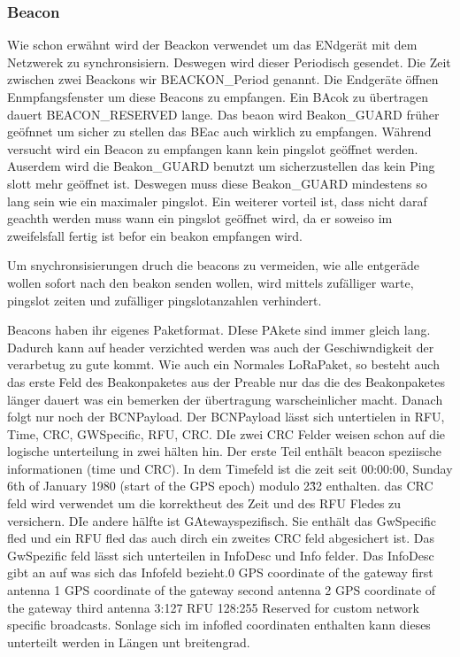 \documentclass[a4paper,12pt]{article}
\begin{document}
            \subsubsection{Beacon}
                Wie schon erwähnt wird der Beackon verwendet um das ENdgerät mit dem Netzwerek zu synchronsisiern. Deswegen wird dieser Periodisch gesendet. Die Zeit zwischen zwei Beackons wir BEACKON\_Period genannt.
                Die Endgeräte öffnen Enmpfangsfenster um diese Beacons zu empfangen. Ein BAcok zu übertragen dauert BEACON\_RESERVED lange. Das beaon wird Beakon\_GUARD früher geöfnnet um sicher zu stellen das BEac auch wirklich zu empfangen. Während versucht wird ein Beacon zu empfangen kann kein pingslot geöffnet werden.
                Auserdem wird die Beakon\_GUARD benutzt um sicherzustellen das kein Ping slott mehr geöffnet ist. Deswegen muss diese Beakon\_GUARD mindestens so lang sein wie ein maximaler pingslot.   Ein weiterer vorteil ist, dass nicht daraf geachth werden muss wann ein pingslot geöffnet wird, da er soweiso im zweifelsfall fertig ist befor ein beakon empfangen wird.

                Um snychronsisierungen druch die beacons zu vermeiden, wie alle entgeräde wollen sofort nach den beakon senden wollen, wird mittels zufälliger warte, pingslot zeiten und zufälliger pingslotanzahlen verhindert.

                Beacons haben ihr eigenes Paketformat. DIese PAkete sind immer gleich lang. Dadurch kann auf header verzichted werden was auch der Geschiwndigkeit der verarbetug zu gute kommt. Wie auch ein Normales LoRaPaket, so besteht auch das erste Feld des Beakonpaketes aus der Preable nur das die des Beakonpaketes länger dauert was ein bemerken der übertragung warscheinlicher macht. Danach folgt nur noch der BCNPayload.
                Der BCNPayload lässt sich untertielen in RFU, Time, CRC, GWSpecific, RFU, CRC. DIe zwei CRC Felder weisen schon auf die logische unterteilung in zwei hälten hin. Der erste Teil enthält beacon speziische informationen (time und CRC). In dem Timefeld ist die zeit seit 00:00:00, Sunday 6th of January 1980 (start of the GPS epoch) modulo 2\^32 enthalten. das CRC feld wird verwendet um die korrektheut des Zeit und des RFU Fledes zu versichern.
                DIe andere hälfte ist GAtewayspezifisch. Sie enthält das GwSpecific fled und ein RFU fled das auch dirch ein zweites CRC feld abgesichert ist. Das GwSpezific feld lässt sich unterteilen in InfoDesc und Info felder. Das InfoDesc gibt an auf was sich das Infofeld bezieht.0
                GPS coordinate of the gateway first antenna
                1
                GPS coordinate of the gateway second antenna
                2
                GPS coordinate of the gateway third antenna
                3:127
                RFU
                128:255
                Reserved for custom network specific broadcasts.
                Sonlage sich im infofled coordinaten enthalten kann dieses unterteilt werden in Längen unt breitengrad.
                
\end{document}
